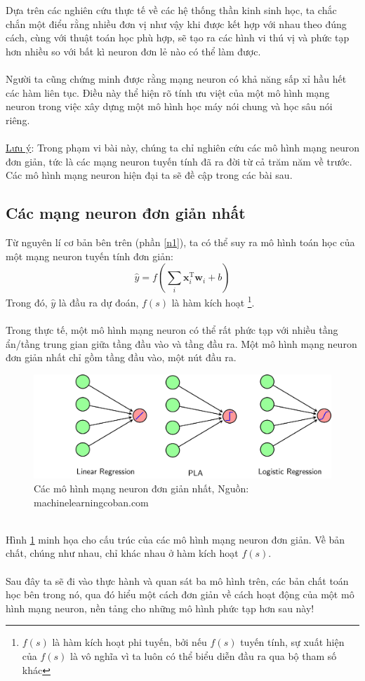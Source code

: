\documentclass{article}
\begin{document}
Dựa trên các nghiên cứu thực tế về các hệ thống thần kinh sinh học, ta chắc chắn một điểu rằng nhiều đơn vị như vậy khi được kết hợp với nhau theo đúng cách, cùng với thuật toán học phù hợp, sẽ tạo ra các hình vi thú vị và phức tạp hơn nhiều so với bất kì neuron đơn lẻ nào có thể làm được.\\\\
Người ta cũng chứng minh được rằng mạng neuron có khả năng sấp xỉ hầu hết các hàm liên tục. Điều này thể hiện rõ tính ưu việt của một mô hình mạng neuron trong việc xây dựng một mô hình học máy nói chung và học sâu nói riêng.\\\\
\underline{Lưu ý}: Trong phạm vi bài này, chúng ta chỉ nghiên cứu các mô hình mạng neuron đơn giản, tức là các mạng neuron tuyến tính đã ra đời từ cả trăm năm về trước. Các mô hình mạng neuron hiện đại ta sẽ đề cập trong các bài sau.

\subsection{Các mạng neuron đơn giản nhất}
Từ nguyên lí cơ bản bên trên (phần \ref{n1}), ta có thể suy ra mô hình toán học của một mạng neuron tuyến tính đơn giản:
\begin{equation}
    \hat{y} = f(\sum_{i}\textbf{x}_{i}^{\text{T}}\textbf{w}_i + b)
\end{equation}
Trong đó, $\hat{y}$ là đầu ra dự đoán, $f(s)$ là hàm kích hoạt \footnote{$f(s)$ là hàm kích hoạt phi tuyến, bởi nếu $f(s)$ tuyến tính, sự xuất hiện của $f(s)$ là vô nghĩa vì ta luôn có thể biểu diễn đầu ra qua bộ tham số khác}. \\\\Trong thực tế, một mô hình mạng neuron có thể rất phức tạp với nhiều tầng ẩn/tầng trung gian giữa tầng đầu vào và tầng đầu ra. Một mô hình mạng neuron đơn giản nhất chỉ gồm tầng đầu vào, một nút đầu ra.
\begin{figure}[ht!]
    \centering
    \includegraphics[width = \linewidth]{3models.png}
    \caption{Các mô hình mạng neuron đơn giản nhất, Nguồn: machinelearningcoban.com}
    \label{fig5}
\end{figure}
\phantom{a}\\
Hình \ref{fig5} minh họa cho cấu trúc của các mô hình mạng neuron đơn giản. Về bản chất, chúng như nhau, chỉ khác nhau ở hàm kích hoạt $f(s)$.\\\\
Sau đây ta sẽ đi vào thực hành và quan sát ba mô hình trên, các bản chất toán học bên trong nó, qua đó hiểu một cách đơn giản về cách hoạt động của một mô hình mạng neuron, nền tảng cho những mô hình phức tạp hơn sau này!
\end{document}
